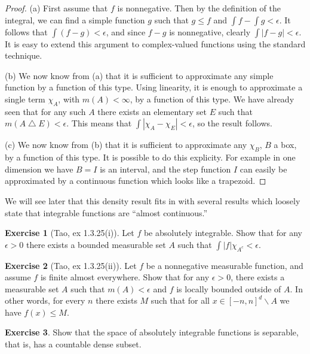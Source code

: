 \documentclass[11pt,oneside]{amsbook}
\renewcommand{\setminus}{\smallsetminus}
\renewcommand{\triangle}{\bigtriangleup}
\theoremstyle{definition}
\newtheorem{exerc}{Exercise}[section]
\theoremstyle{plain}
\theoremstyle{definition}
\theoremstyle{remark}
\numberwithin{equation}{section}
\numberwithin{figure}{section}
\begin{document}
\begin{proof}
  (a) First assume that $f$ is nonnegative. Then by the definition of the integral, we can find a simple function $g$ such that $g\leq f$ and $\int f-\int g<\epsilon$. It follows that $\int(f-g)<\epsilon$, and since $f-g$ is nonnegative, clearly $\int|f-g|<\epsilon$. It is easy to extend this argument to complex-valued functions using the standard technique.

  (b) We now know from (a) that it is sufficient to approximate any simple function by a function of this type. Using linearity, it is enough to approximate a single term $\chi_A$, with $m(A)<\infty$, by a function of this type. We have already seen that for any such $A$ there exists an elementary set $E$ such that $m(A\triangle E)<\epsilon$. This means that $\int|\chi_A-\chi_E|<\epsilon$, so the result follows.

  (c) We now know from (b) that it is sufficient to approximate any $\chi_B$, $B$ a box, by a function of this type. It is possible to do this explicity. For example in one dimension we have $B=I$ is an interval, and the step function $I$ can easily be approximated by a continuous function which looks like a trapezoid.
\end{proof}

We will see later that this density result fits in with several results which loosely state that integrable functions are ``almost continuous.''

\begin{exerc}[Tao, ex 1.3.25(i)]
  Let $f$ be absolutely integrable. Show that for any $\epsilon>0$ there exists a bounded measurable set $A$ such that $\int |f|\chi_{A^c}<\epsilon$.
\end{exerc}

\begin{exerc}[Tao, ex 1.3.25(ii)]
  Let $f$ be a nonnegative measurable function, and assume $f$ is finite almost everywhere. Show that for any $\epsilon>0$, there exists a measurable set $A$ such that $m(A)<\epsilon$ and $f$ is locally bounded outside of $A$. In other words, for every $n$ there exists $M$ such that for all $x\in[-n,n]^d\setminus A$ we have $f(x)\leq M$.
\end{exerc}

\begin{exerc}
  Show that the space of absolutely integrable functions is separable, that is, has a countable dense subset.
\end{exerc}

\newpage
\end{document}
